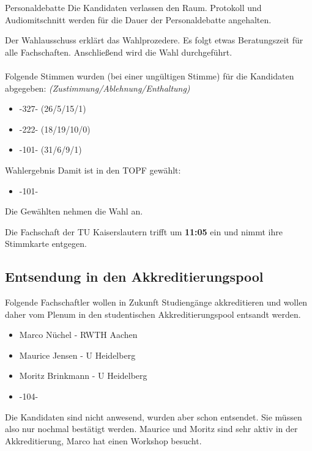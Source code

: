     \begin{info}{Personaldebatte}
      Die Kandidaten verlassen den Raum. Protokoll und Audiomitschnitt werden für die Dauer der Personaldebatte angehalten.
    \end{info}

    Der Wahlausschuss erklärt das Wahlprozedere.
    Es folgt etwas Beratungszeit für alle Fachschaften. Anschließend wird die Wahl durchgeführt. \\ \\

    Folgende Stimmen wurden (bei einer ungültigen Stimme) für die Kandidaten abgegeben: \textit{(Zustimmung/Ablehnung/Enthaltung)}
    \begin{itemize}
      \item -327- (26/5/15/1)
      \item -222- (18/19/10/0)
      \item -101- (31/6/9/1)
    \end{itemize}

    \begin{success}{Wahlergebnis}
      Damit ist in den TOPF gewählt:
      \begin{itemize}
        \item -101-
      \end{itemize}
      \tcblower
      Die Gewählten nehmen die Wahl an.
    \end{success}

    \begin{info}{}
      Die Fachschaft der TU Kaiserslautern trifft um \textbf{11:05} ein und nimmt ihre Stimmkarte entgegen.
    \end{info}

  \subsection{Entsendung in den Akkreditierungspool}
    Folgende Fachschaftler wollen in Zukunft Studiengänge akkreditieren und wollen daher vom Plenum in den studentischen Akkreditierungspool entsandt werden.
    \begin{itemize}
      \item Marco Nüchel - RWTH Aachen
      \item Maurice Jensen - U Heidelberg
      \item Moritz Brinkmann - U Heidelberg
      \item -104-
    \end{itemize}
    Die Kandidaten sind nicht anwesend, wurden aber schon entsendet. Sie müssen also nur nochmal bestätigt werden. Maurice und Moritz sind sehr aktiv in der Akkreditierung, Marco hat einen Workshop besucht. \\


